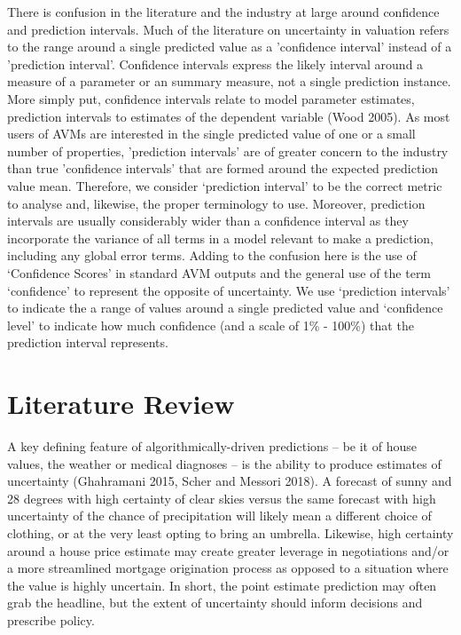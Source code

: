 \documentclass[colTwo]{anon}
\theoremstyle{definition}
\begin{document}
There is confusion in the literature and the industry at large around confidence and prediction intervals. Much of the literature on uncertainty in valuation refers to the range around a single predicted value as a 'confidence interval' instead of a 'prediction interval'.  Confidence intervals express the likely interval around a measure of a parameter or an summary measure, not a single prediction instance. More simply put, confidence intervals relate to model parameter estimates, prediction intervals to estimates of the dependent variable (Wood 2005). As most users of AVMs are interested in the single predicted value of one or a small number of properties, 'prediction intervals' are of greater concern to the industry than true 'confidence intervals' that are formed around the expected prediction value mean. Therefore, we consider ‘prediction interval’ to be the correct metric to analyse and, likewise, the proper terminology to use.  Moreover, prediction intervals are usually considerably wider than a confidence interval as they incorporate the variance of all terms in a model relevant to make a prediction, including any global error terms. Adding to the confusion here is the use of ‘Confidence Scores’ in standard AVM outputs and the general use of the term ‘confidence’ to represent the opposite of uncertainty. We use ‘prediction intervals’ to indicate the a range of values around a single predicted value and ‘confidence level’ to indicate how much confidence (and a scale of 1\% - 100\%) that the prediction interval represents.

\section{Literature Review}

A key defining feature of algorithmically-driven predictions -- be it of house values, the weather or medical diagnoses -- is the ability to produce estimates of uncertainty (Ghahramani 2015, Scher and Messori 2018).  A forecast of sunny and 28 degrees with high certainty of clear skies versus the same forecast with high uncertainty of the chance of precipitation will likely mean a different choice of clothing, or at the very least opting to bring an umbrella.  Likewise, high certainty around a house price estimate may create greater leverage in negotiations and/or a more streamlined mortgage origination process as opposed to a situation where the value is highly uncertain.  In short, the point estimate prediction may often grab the headline, but the extent of uncertainty should inform decisions and prescribe policy.   
\end{document}
